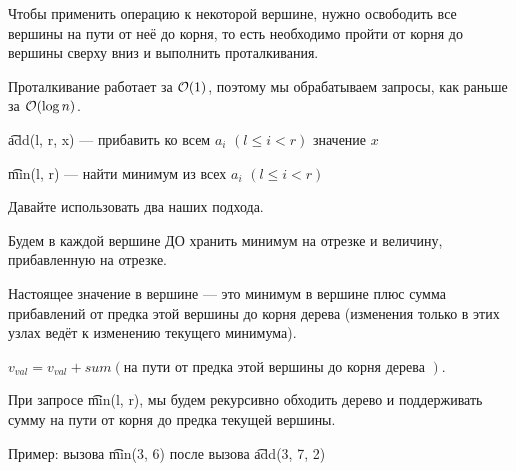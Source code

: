 Чтобы применить операцию к некоторой вершине, нужно освободить все вершины на пути от неё до корня, то есть необходимо пройти от корня до вершины сверху вниз и выполнить проталкивания.

Проталкивание работает за $\mathcal{O}(1)$, поэтому мы обрабатываем запросы, как раньше за $\mathcal{O}(\log n)$.


\begin{MyList}[0pt]
	\item \t{add(l, r, x)} --- прибавить ко всем $a_i$ $(l \le i < r)$ значение $x$
	\item \t{min(l, r)} --- найти минимум из всех $a_i$ $(l \le i < r)$
\end{MyList}
\up \up

Давайте использовать два наших подхода. 

Будем в каждой вершине ДО хранить минимум на отрезке и величину, прибавленную на отрезке.

Настоящее значение в вершине --- это минимум в вершине плюс сумма прибавлений от предка этой вершины до корня дерева (изменения только в этих узлах ведёт к изменению текущего минимума). 

$v_{val} = v_{val} + sum(\text{на пути от предка этой вершины до корня дерева })$.
\down


При запросе \t{min(l, r)}, мы будем рекурсивно обходить дерево и поддерживать сумму на пути от корня до предка текущей вершины. 

\pagebreak

Пример: вызова \t{min(3, 6)} после вызова \t{add(3, 7, 2)}

\up \up
\begin{center}
	\begin{figure}[h]
	\end{figure}
\end{center}

